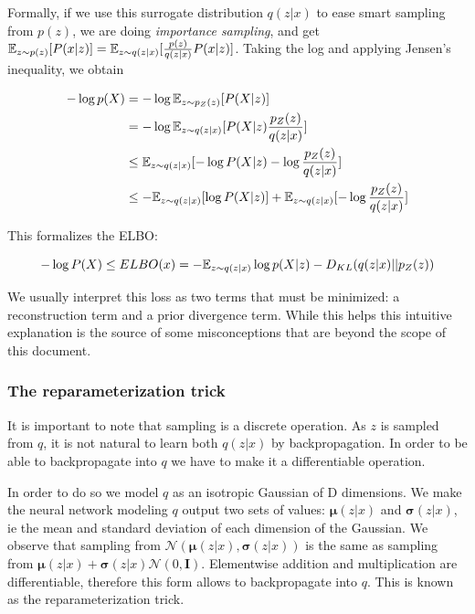 Formally, if we use this surrogate distribution $q(z|x)$ to ease smart sampling from $p(z)$, we are doing \emph{importance sampling}, and get $\mathbb{E}_{z \sim p(z)} [P(x|z)] = \mathbb{E}_{z \sim q(z|x)}[\frac{p(z)}{q(z|x)}P(x|z)]$. Taking the log and applying Jensen's inequality, we obtain

\begin{equation}
\begin{split}
    - \log p(X) & = - \log \mathbb{E}_{z \sim p_Z(z)} [P(X | z) ] \\
    & = - \log \mathbb{E}_{z \sim q(z|x)} [ P(X | z) \frac{p_Z(z)}{q(z|x)} ] \\
    & \leq \mathbb{E}_{z \sim q(z|x)} [- \log P(X | z)  - \log \frac{p_Z(z)}{q(z|x)}] \\
    & \leq -\mathbb{E}_{z \sim q(z|x)}[\log P(X | z)] + \mathbb{E}_{z \sim q(z|x)} [- \log \frac{p_Z(z)}{q(z|x)}] \\
\end{split}
\end{equation}

This formalizes the \ac{ELBO}:

\begin{equation}
    - \log P(X) \leq ELBO(x) = - \mathbb{E}_{z \sim q(z | x)} \log p(X | z) - D_{KL}(q(z | x) || p_Z(z))
\end{equation}

We usually interpret this loss as two terms that must be minimized: a reconstruction term and a prior divergence term. While this helps this intuitive explanation is the source of some misconceptions that are beyond the scope of this document.

\subsubsection{The reparameterization trick}

It is important to note that sampling is a discrete operation. As $z$ is sampled from $q$, it is not natural to learn both $q(z|x)$ by backpropagation. In order to be able to backpropagate into $q$ we have to make it a differentiable operation.

In order to do so we model $q$ as an isotropic Gaussian of D dimensions. We make the neural network modeling $q$ output two sets of values: $\boldsymbol{\mu}(z|x)$ and $\boldsymbol{\sigma}(z|x)$, ie the mean and standard deviation of each dimension of the Gaussian. We observe that sampling from $\mathcal{N}(\boldsymbol{\mu}(z|x), \boldsymbol{\sigma}(z|x))$ is the same as sampling from $\boldsymbol{\mu}(z|x) + \boldsymbol{\sigma}(z|x)\mathcal{N}(0, \mathbf{I})$. Elementwise addition and multiplication are differentiable, therefore this form allows to backpropagate into $q$. This is known as the reparameterization trick.


